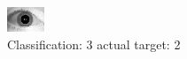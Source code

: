 \begin{figure}[h!]
\begin{center}
\includegraphics[width=0.60\columnwidth]{figures/ID1752_class_3_target_2.png}
\end{center}
\caption{ Classification: 3 actual target: 2}
\label{fig:ID1752_class_3_target_2}
\end{figure}
